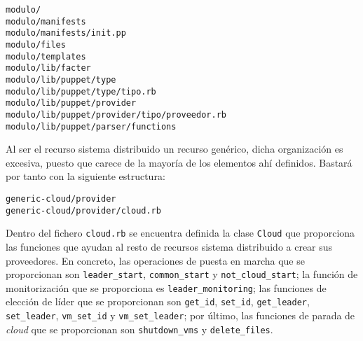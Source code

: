 \begin{lstlisting}
modulo/
modulo/manifests
modulo/manifests/init.pp
modulo/files
modulo/templates
modulo/lib/facter
modulo/lib/puppet/type
modulo/lib/puppet/type/tipo.rb
modulo/lib/puppet/provider
modulo/lib/puppet/provider/tipo/proveedor.rb
modulo/lib/puppet/parser/functions
\end{lstlisting}

Al ser el recurso sistema distribuido un recurso genérico, dicha organización es excesiva, puesto que carece de la mayoría de los elementos ahí definidos. Bastará por tanto con la siguiente estructura:

\begin{lstlisting}
generic-cloud/provider
generic-cloud/provider/cloud.rb
\end{lstlisting}

Dentro del fichero \texttt{cloud.rb} se encuentra definida la clase \texttt{Cloud} que proporciona las funciones que ayudan al resto de recursos sistema distribuido a crear sus proveedores. En concreto, las operaciones de puesta en marcha que se proporcionan son \texttt{leader\_start}, \texttt{common\_start} y \texttt{not\_cloud\_start}; la función de monitorización que se proporciona es \texttt{leader\_monitoring}; las funciones de elección de líder que se proporcionan son \texttt{get\_id}, \texttt{set\_id}, \texttt{get\_leader}, \texttt{set\_leader}, \texttt{vm\_set\_id} y \texttt{vm\_set\_leader}; por último, las funciones de parada de \emph{cloud} que se proporcionan son \texttt{shutdown\_vms} y \texttt{delete\_files}.
